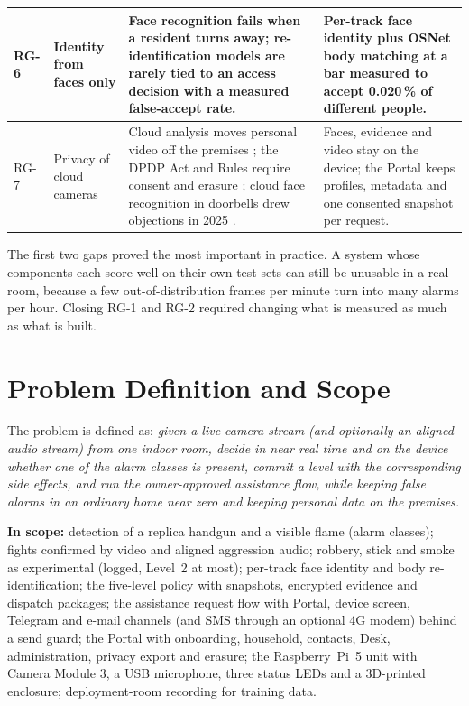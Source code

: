 \begin{table}[htbp]
\begin{tabularx}{\textwidth}{|C{0.9cm}|L{3.4cm}|Y|L{3.6cm}|}
RG-6 & Identity from faces only & Face recognition \cite{deng2019arcface, guo2022scrfd} fails when a resident turns away; re-identification models \cite{zhou2019osnet, ye2022reid} are rarely tied to an access decision with a measured false-accept rate. & Per-track face identity plus OSNet body matching at a bar measured to accept 0.020\,\% of different people.\\ \hline
RG-7 & Privacy of cloud cameras & Cloud analysis moves personal video off the premises \cite{shi2016edge}; the DPDP Act and Rules require consent and erasure \cite{dpdp2023, pib2025dpdp}; cloud face recognition in doorbells drew objections in 2025 \cite{perez2025ringfaces}. & Faces, evidence and video stay on the device; the Portal keeps profiles, metadata and one consented snapshot per request.\\ \hline
\end{tabularx}
\end{table}

The first two gaps proved the most important in practice. A system whose components each score well on their own test sets can still be unusable in a real room, because a few out-of-distribution frames per minute turn into many alarms per hour. Closing RG-1 and RG-2 required changing what is measured as much as what is built.

\section{Problem Definition and Scope}
\label{sec:scope}
The problem is defined as: \emph{given a live camera stream (and optionally an aligned audio stream) from one indoor room, decide in near real time and on the device whether one of the alarm classes is present, commit a level with the corresponding side effects, and run the owner-approved assistance flow, while keeping false alarms in an ordinary home near zero and keeping personal data on the premises.}

\textbf{In scope:} detection of a replica handgun and a visible flame (alarm classes); fights confirmed by video and aligned aggression audio; robbery, stick and smoke as experimental (logged, Level~2 at most); per-track face identity and body re-identification; the five-level policy with snapshots, encrypted evidence and dispatch packages; the assistance request flow with Portal, device screen, Telegram and e-mail channels (and SMS through an optional 4G modem) behind a send guard; the Portal with onboarding, household, contacts, Desk, administration, privacy export and erasure; the Raspberry~Pi~5 unit with Camera Module 3, a USB microphone, three status LEDs and a 3D-printed enclosure; deployment-room recording for training data.

